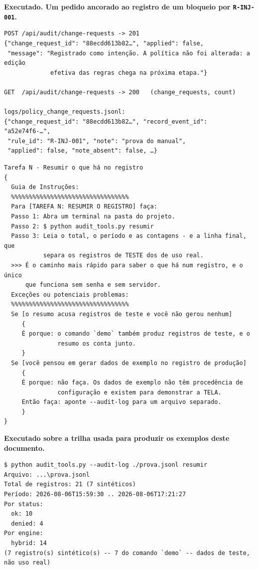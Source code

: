 \documentclass[10pt]{article}
\begin{document}
\textbf{Executado. Um pedido ancorado ao registro de um bloqueio por \texttt{R-INJ-001}.}

\begin{lstlisting}
POST /api/audit/change-requests -> 201
{"change_request_id": "88ecdd613b82…", "applied": false,
 "message": "Registrado como intenção. A política não foi alterada: a edição
             efetiva das regras chega na próxima etapa."}

GET  /api/audit/change-requests -> 200   (change_requests, count)

logs/policy_change_requests.jsonl:
{"change_request_id": "88ecdd613b82…", "record_event_id": "a52e74f6-…",
 "rule_id": "R-INJ-001", "note": "prova do manual",
 "applied": false, "note_absent": false, …}
\end{lstlisting}

\begin{lstlisting}
Tarefa N - Resumir o que há no registro
{
  Guia de Instruções:
  %%%%%%%%%%%%%%%%%%%%%%%%%%%%%%%%%
  Para [TAREFA N: RESUMIR O REGISTRO] faça:
  Passo 1: Abra um terminal na pasta do projeto.
  Passo 2: $ python audit_tools.py resumir
  Passo 3: Leia o total, o período e as contagens - e a linha final, que
           separa os registros de TESTE dos de uso real.
  >>> É o caminho mais rápido para saber o que há num registro, e o único
      que funciona sem senha e sem servidor.
  Exceções ou potenciais problemas:
  %%%%%%%%%%%%%%%%%%%%%%%%%%%%%%%%%
  Se [o resumo acusa registros de teste e você não gerou nenhum]
     {
     É porque: o comando `demo` também produz registros de teste, e o
               resumo os conta junto.
     }
  Se [você pensou em gerar dados de exemplo no registro de produção]
     {
     É porque: não faça. Os dados de exemplo não têm procedência de
               configuração e existem para demonstrar a TELA.
     Então faça: aponte --audit-log para um arquivo separado.
     }
}
\end{lstlisting}

\textbf{Executado sobre a trilha usada para produzir os exemplos deste documento.}

\begin{lstlisting}
$ python audit_tools.py --audit-log ./prova.jsonl resumir
Arquivo: ...\prova.jsonl
Total de registros: 21 (7 sintéticos)
Período: 2026-08-06T15:59:30 .. 2026-08-06T17:21:27
Por status:
  ok: 10
  denied: 4
Por engine:
  hybrid: 14
(7 registro(s) sintético(s) -- 7 do comando `demo` -- dados de teste, não uso real)
\end{lstlisting}
\end{document}
